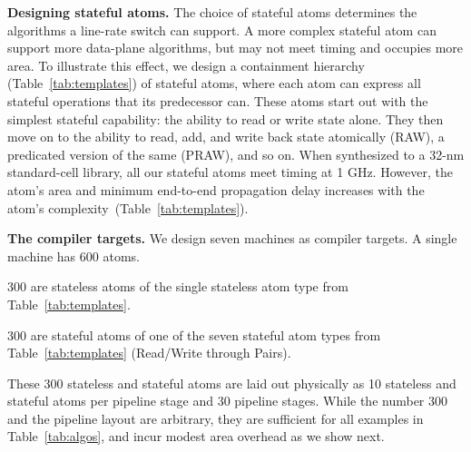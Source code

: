 \medskip
\noindent
\textbf{Designing stateful atoms.}
The choice of stateful atoms determines the algorithms a line-rate switch can
support. A more complex stateful atom can support more data-plane algorithms,
but may not meet timing and occupies more area. To illustrate this effect, we
design a containment hierarchy (Table~\ref{tab:templates}) of stateful atoms,
where each atom can express all stateful operations that its predecessor can.
These atoms start out with the simplest stateful capability: the ability to
read or write state alone.  They then move on to the ability to read, add, and
write back state atomically (RAW), a predicated version of the same (PRAW), and
so on. When synthesized to a 32-nm standard-cell library, all our stateful
atoms meet timing at 1 GHz.  However, the atom's area and minimum end-to-end
propagation delay increases with the atom's
complexity~(Table~\ref{tab:templates}).


\medskip
\noindent
\textbf{The compiler targets.}
We design seven \absmachine machines as compiler targets. A single
\absmachine machine has 600 atoms.
\begin{CompactEnumerate}
\item 300 are stateless atoms of the single stateless atom type from
Table~\ref{tab:templates}.
\item 300 are stateful atoms of one of the seven stateful atom types from
Table~\ref{tab:templates} (Read/Write through Pairs).
\end{CompactEnumerate}
These 300 stateless and stateful atoms are laid out physically as 10 stateless
and stateful atoms per pipeline stage and 30 pipeline stages. While the number
300 and the pipeline layout are arbitrary, they are sufficient for all
examples in Table~\ref{tab:algos}, and incur modest area overhead
as we show next.

